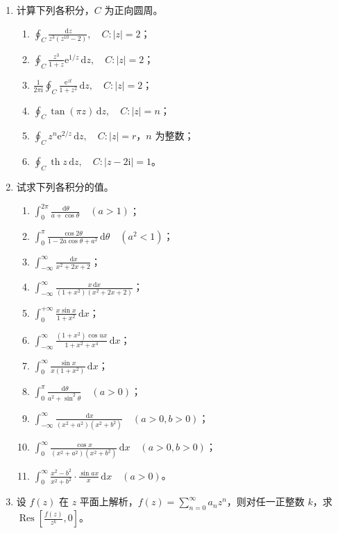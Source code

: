 \documentclass[UTF8,11pt,a4paper]{ctexart}
\newcommand{\dd}{\,\mathrm{d}}
\newcommand{\ee}{\mathrm{e}}
\newcommand{\ii}{\mathrm{i}}
\newcommand{\Res}{\operatorname{Res}}
\newcommand{\thh}{\operatorname{th}}
\begin{document}
\begin{enumerate}
\item 计算下列各积分，$C$ 为正向圆周。
  \begin{enumerate}
  \item $\displaystyle\oint_C\frac{\dd z}{z^3(z^{10}-2)},\quad C:|z|=2$；
  \item $\displaystyle\oint_C\frac{z^3}{1+z}\ee^{1/z}\dd z,\quad C:|z|=2$；
  \item $\displaystyle\frac1{2\pi\ii}\oint_C\frac{\ee^{zt}}{1+z^2}\dd z,\quad C:|z|=2$；
  \item $\displaystyle\oint_C\tan(\pi z)\dd z,\quad C:|z|=n$；
  \item $\displaystyle\oint_C z^n\ee^{2/z}\dd z,\quad C:|z|=r$，$n$ 为整数；
  \item $\displaystyle\oint_C\thh z\dd z,\quad C:|z-2\ii|=1$。
  \end{enumerate}

\item 试求下列各积分的值。
  \begin{enumerate}
  \item $\displaystyle\int_0^{2\pi}\frac{\dd\theta}{a+\cos\theta}\quad(a>1)$；
  \item $\displaystyle\int_0^\pi\frac{\cos2\theta}{1-2a\cos\theta+a^2}\dd\theta\quad(a^2<1)$；
  \item $\displaystyle\int_{-\infty}^{\infty}\frac{\dd x}{x^2+2x+2}$；
  \item $\displaystyle\int_{-\infty}^{\infty}\frac{x\dd x}{(1+x^2)(x^2+2x+2)}$；
  \item $\displaystyle\int_0^{+\infty}\frac{x\sin x}{1+x^2}\dd x$；
  \item $\displaystyle\int_{-\infty}^{\infty}\frac{(1+x^2)\cos ux}{1+x^2+x^4}\dd x$；
  \item $\displaystyle\int_0^{\infty}\frac{\sin x}{x(1+x^2)}\dd x$；
  \item $\displaystyle\int_0^\pi\frac{\dd\theta}{a^2+\sin^2\theta}\quad(a>0)$；
  \item $\displaystyle\int_{-\infty}^{\infty}\frac{\dd x}{(x^2+a^2)(x^2+b^2)}\quad(a>0,b>0)$；
  \item $\displaystyle\int_0^{\infty}\frac{\cos x}{(x^2+a^2)(x^2+b^2)}\dd x\quad(a>0,b>0)$；
  \item $\displaystyle\int_0^{\infty}\frac{x^2-b^2}{x^2+b^2}\cdot\frac{\sin ax}{x}\dd x\quad(a>0)$。
  \end{enumerate}

\item 设 $f(z)$ 在 $z$ 平面上解析，$f(z)=\displaystyle\sum_{n=0}^{\infty}a_nz^n$，则对任一正整数 $k$，求
$\displaystyle\Res\left[\frac{f(z)}{z^k},0\right]$。


\end{enumerate}
\end{document}
